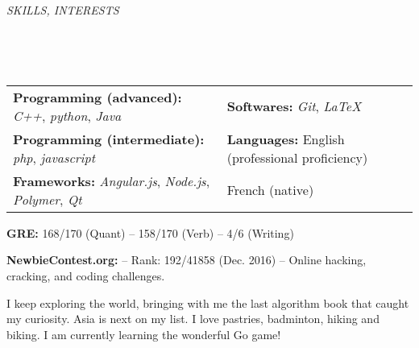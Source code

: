 \documentclass[a4paper, 12pt]{article}
\newcommand{\marginline}{-0.3cm}
\newcommand{\margincontent}{-0.6cm}
\newcommand{\marginbeforesection}{0.3cm}
\newcommand{\marginmisc}{0.15cm}
\newcommand{\marginbeforemisc}{-0.75cm}
\newcommand{\linewidthperso}{0.02cm}
\newcommand{\stylesection}[1]{
  \vspace{\marginbeforesection}
  \begin{normalsize}\textit{#1}\end{normalsize}
  \vspace{\marginline}\\
  \noindent\makebox[\linewidth]{\rule{\textwidth}{\linewidthperso}}

}
\begin{document}
\begin{footnotesize}
%

\stylesection{SKILLS, INTERESTS}
~\\
\vspace{\marginbeforemisc}

\noindent\begin{tabular}{@{}p{9cm}p{8cm}}
  \textbf{Programming (advanced):} \textit{C++}, \textit{python}, \textit{Java} & \textbf{Softwares:} \textit{Git}, \textit{LaTeX}\\
  \textbf{Programming (intermediate):} \textit{php}, \textit{javascript} & \textbf{Languages:} English (professional proficiency)\\
  \textbf{Frameworks:} \textit{Angular.js}, \textit{Node.js}, \textit{Polymer}, \textit{Qt} & \hspace{2cm} French (native)
\end{tabular}

\vspace{\marginmisc}
\textbf{GRE:} 168/170 (Quant) -- 158/170 (Verb) -- 4/6 (Writing)

\vspace{\marginmisc}
\textbf{NewbieContest.org:} -- Rank: 192/41858 (Dec. 2016) -- Online hacking, cracking, and coding challenges.

\vspace{\marginmisc}
I keep exploring the world, bringing with me the last algorithm book that caught my curiosity. Asia is next on my list. I love pastries, badminton, hiking and biking. I am currently learning the wonderful Go game!
  
\end{footnotesize}
\end{document}
